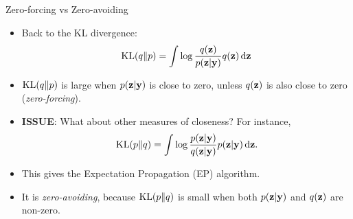 \begin{frame}{Zero-forcing vs Zero-avoiding}
  \begin{itemize}
    \item Back to the KL divergence:
    \[
      \operatorname{KL}(q \Vert p) = \int \log \frac{q({\mathbf z})}{p({\mathbf z}|{\mathbf y})} q({\mathbf z}) \, \text{d}{\mathbf z}
    \]
    \item $\operatorname{KL}(q \Vert p)$ is large when $p({\mathbf z}|{\mathbf y})$ is close to zero, unless $q({\mathbf z})$ is also close to zero (\emph{zero-forcing}).
    \item \textbf{ISSUE}: What about other measures of closeness? For instance,
    \[
      \operatorname{KL}(p \Vert q) = \int \log \frac{p({\mathbf z}|{\mathbf y})}{q({\mathbf z}|{\mathbf y})} p({\mathbf z}|{\mathbf y}) \, \text{d}{\mathbf z}.
    \]
    \item This gives the Expectation Propagation (EP) algorithm. 
    \item It is \emph{zero-avoiding}, because $\operatorname{KL}(p\Vert q)$ is small when both $p({\mathbf z}|{\mathbf y})$ and $q({\mathbf z})$ are non-zero.
  \end{itemize}
\end{frame}

